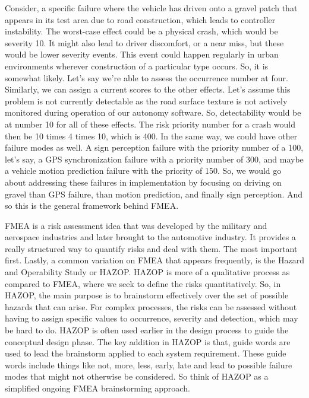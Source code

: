 Consider, a specific failure where the vehicle has driven onto a gravel patch that appears in its test area due to road construction, 
which leads to controller instability. The worst-case effect could be a physical crash, which would be severity 10. 
It might also lead to driver discomfort, or a near miss, but these would be lower severity events. 
This event could happen regularly in urban environments wherever construction of a particular type occurs. 
So, it is somewhat likely. Let's say we're able to assess the occurrence number at four. Similarly, we can assign a current scores to the other effects. 
Let's assume this problem is not currently detectable as the road surface texture is not actively monitored during operation of our autonomy software. 
So, detectability would be at number 10 for all of these effects. 
The risk priority number for a crash would then be 10 times 4 times 10, which is 400. 
In the same way, we could have other failure modes as well. A sign perception failure with the priority number of a 100, let's say, 
a GPS synchronization failure with a priority number of 300, and maybe a vehicle motion prediction failure with the priority of 150. 
So, we would go about addressing these failures in implementation by focusing on driving on gravel than GPS failure, than motion prediction, and finally sign perception. 
And so this is the general framework behind FMEA. 

FMEA is a risk assessment idea that was developed by the military and aerospace industries and later brought to the automotive industry. 
It provides a really structured way to quantify risks and deal with them. The most important first. 
Lastly, a common variation on FMEA that appears frequently, is the Hazard and Operability Study or HAZOP. 
HAZOP is more of a qualitative process as compared to FMEA, where we seek to define the risks quantitatively. 
So, in HAZOP, the main purpose is to brainstorm effectively over the set of possible hazards that can arise. 
For complex processes, the risks can be assessed without having to assign specific values to occurrence, severity and detection, which may be hard to do. 
HAZOP is often used earlier in the design process to guide the conceptual design phase. 
The key addition in HAZOP is that, guide words are used to lead the brainstorm applied to each system requirement. 
These guide words include things like not, more, less, early, late and lead to possible failure modes that might not otherwise be considered. 
So think of HAZOP as a simplified ongoing FMEA brainstorming approach. 

